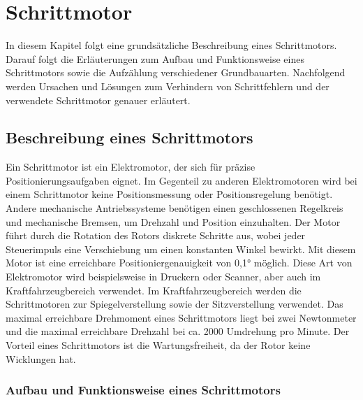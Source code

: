 %
%
%



\chapter{Schrittmotor}

In diesem Kapitel folgt eine grundsätzliche Beschreibung eines Schrittmotors. Darauf folgt die Erläuterungen zum Aufbau und Funktionsweise eines Schrittmotors sowie die Aufzählung verschiedener Grundbauarten. Nachfolgend werden Ursachen und Lösungen zum Verhindern von Schrittfehlern und der verwendete Schrittmotor genauer erläutert.

\section{Beschreibung eines Schrittmotors}

Ein Schrittmotor ist ein Elektromotor, der sich für präzise Positionierungsaufgaben eignet. Im Gegenteil zu anderen Elektromotoren wird bei einem Schrittmotor keine Positionsmessung oder Positionsregelung benötigt. Andere mechanische Antriebssysteme benötigen einen geschlossenen Regelkreis und mechanische Bremsen, um Drehzahl und Position einzuhalten. Der Motor führt durch die Rotation des Rotors diskrete Schritte aus, wobei jeder Steuerimpuls eine Verschiebung um einen konstanten Winkel bewirkt. Mit diesem Motor ist eine erreichbare Positioniergenauigkeit von 0,1° möglich. Diese Art von Elektromotor wird beispielsweise in Druckern oder Scanner, aber auch im Kraftfahrzeugbereich verwendet. Im Kraftfahrzeugbereich werden die Schrittmotoren zur Spiegelverstellung sowie der Sitzverstellung verwendet. Das maximal erreichbare Drehmoment eines Schrittmotors liegt bei zwei Newtonmeter und die maximal erreichbare Drehzahl bei ca. 2000 Umdrehung pro Minute. Der Vorteil eines Schrittmotors ist die Wartungsfreiheit, da der Rotor keine Wicklungen hat. \cite{Babiel:2023,Hagl:2021,Bernstein:2018,Schroeder:2021}

\subsection{Aufbau und Funktionsweise eines Schrittmotors}

